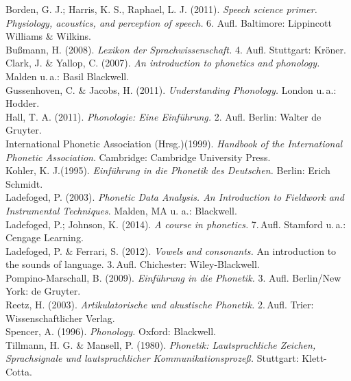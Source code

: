 \documentclass[11pt]{book}
\begin{document}
Borden, G. J.; Harris, K. S., Raphael, L. J. (2011). \emph{Speech science primer. Physiology, acoustics, and perception of speech.} 6. Aufl. Baltimore: Lippincott Williams \& Wilkins. \newline\\
Bußmann, H. (2008). \emph{Lexikon der Sprachwissenschaft.} 4. Aufl. Stuttgart: Kröner. \newline\\
Clark, J. \& Yallop, C. (2007). \emph{An introduction to phonetics and phonology.} Malden u.\,a.:  Basil Blackwell.\newline\\
Gussenhoven, C. \& Jacobs, H. (2011). \emph{Understanding Phonology.} London  u.\,a.: Hodder.\newline\\
Hall, T. A. (2011).\emph{ Phonologie: Eine Einführung.} 2. Aufl. Berlin: Walter de Gruyter. \newline\\
International Phonetic Association (Hrsg.)(1999). \emph{Handbook of the International Phonetic Association}. Cambridge: Cambridge University Press. \newline\\
Kohler, K. J.(1995). \emph{Einführung in die Phonetik des Deutschen.} Berlin: Erich Schmidt. \newline\\
Ladefoged, P. (2003). \emph{Phonetic Data Analysis. An Introduction to Fieldwork and Instrumental Techniques}. Malden, MA u. a.: Blackwell.\newline\\
Ladefoged, P.; Johnson, K.  (2014). \emph{A course in phonetics.} 7.\,Aufl. Stamford u.\,a.: Cengage Learning. \newline\\
Ladefoged, P. \& Ferrari, S. (2012). \emph{Vowels and consonants.} An introduction to the sounds of language. 3.\,Aufl. Chichester: Wiley-Blackwell. \newline\\
Pompino-Marschall, B. (2009). \emph{Einführung in die Phonetik.} 3. Aufl. Berlin/New York: de Gruyter.  \newline\\
Reetz, H. (2003). \emph{Artikulatorische und akustische Phonetik.} 2.\,Aufl. Trier: Wissenschaftlicher Verlag.  \newline\\
Spencer, A. (1996). \emph{Phonology.} Oxford: Blackwell.\newline\\
Tillmann, H. G. \& Mansell, P. (1980). \emph{Phonetik: Lautsprachliche Zeichen, Sprachsignale und lautsprachlicher Kommunikationsprozeß.} Stuttgart: Klett-Cotta. \newline\\
\end{document}
